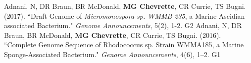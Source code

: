 \begin{cvpubs}
  \cvpub
    {Adnani, N, DR Braun, BR McDonald, \textbf{MG Chevrette}, CR Currie, TS Bugni. (2017). ``Draft Genome of \textit{Micromonospora sp. WMMB-235}, a Marine Ascidian-associated Bacterium." \textit{Genome Announcements}, 5(2), 1-2. \textit{} } %
    {G2} %
  \cvpub
  {Adnani, N, DR Braun, BR McDonald, \textbf{MG Chevrette}, CR Currie, TS Bugni. (2016). ``Complete Genome Sequence of Rhodococcus sp. Strain WMMA185, a Marine Sponge-Associated Bacterium." \textit{Genome Announcements}, 4(6), 1–2. \textit{}} %
    {G1} %
\end{cvpubs}


